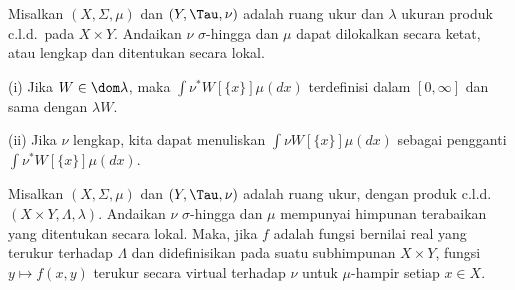 
 Misalkan $(X,\Sigma,\mu)$ dan $(Y,\Tau,\nu)$
adalah ruang ukur dan $\lambda$ ukuran produk c.l.d.\ pada $X\times Y$.
Andaikan $\nu$ $\sigma$-hingga dan $\mu$ dapat dilokalkan secara ketat,
atau lengkap dan ditentukan secara lokal.

(i) Jika $W\in\dom\lambda$, maka $\int\nu^*W[\{x\}]\mu(dx)$
terdefinisi dalam $[0,\infty]$ dan sama dengan $\lambda W$.

(ii) Jika $\nu$ lengkap, kita dapat menuliskan
$\int\nu W[\{x\}]\mu(dx)$ sebagai pengganti
$\int\nu^*W[\{x\}]\mu(dx)$.


 Misalkan $(X,\Sigma,\mu)$ dan $(Y,\Tau,\nu)$
adalah ruang ukur, dengan produk c.l.d.\ $(X\times Y,\Lambda,\lambda)$.
Andaikan $\nu$ $\sigma$-hingga dan $\mu$
mempunyai himpunan terabaikan yang ditentukan secara lokal.
Maka, jika $f$ adalah fungsi bernilai real yang terukur terhadap $\Lambda$
dan didefinisikan pada suatu subhimpunan $X\times Y$, fungsi
$y\mapsto f(x,y)$ terukur secara virtual terhadap $\nu$ untuk
$\mu$-hampir setiap $x\in X$.

